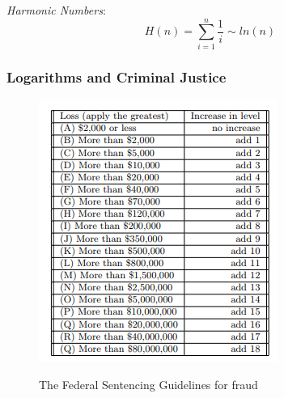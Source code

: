 \emph{Harmonic Numbers}: 
$$H(n) = \sum_{i=1}^{n} \frac{1}{i} \sim ln(n)$$

\subsubsection{Logarithms and Criminal Justice}


\begin{figure}[H]
  \centering
     \includegraphics[scale=0.9]{./2_8.png}
  \label{fig:demo-diagram2-8}
  \caption{The Federal Sentencing Guidelines for fraud}
\end{figure}

\noindent{}
